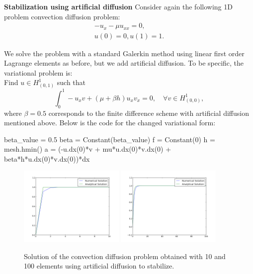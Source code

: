 \begin{example}{\textbf{Stabilization using artificial diffusion}} \label{cd:ex2} 
Consider again the following 1D problem convection diffusion problem: 
\begin{eqnarray}
-u_x - \mu u_{xx} = 0, \\ 
u(0) = 0, u(1) = 1 . 
\end{eqnarray}

We solve the problem with a standard Galerkin method using linear first
order Lagrange elements as before, but we add artificial diffusion. To be specific, the variational problem is:  \\   
Find $u \in H^1_{(0,1)}$ such that 
\[
\int_0^1 -u_x v + (\mu + \beta h) u_x v_x = 0, \quad \forall v \in H^1_{(0,0)},    
\]
where $\beta=0.5$ corresponds to the finite difference scheme with artificial diffusion mentioned
above.  Below is the code for the changed variational form:

\begin{python}
  beta_value = 0.5 
  beta = Constant(beta_value)
  f = Constant(0)
  h = mesh.hmin()
  a = (-u.dx(0)*v + mu*u.dx(0)*v.dx(0) + beta*h*u.dx(0)*v.dx(0))*dx  
\end{python}

\begin{figure}
\begin{center}
\includegraphics[width=0.45\textwidth]{chapters/conv-diff/plots/conv-diff-stab.png}
\includegraphics[width=0.45\textwidth]{chapters/conv-diff/plots/conv-diff-hr-stab.png}
\caption{Solution of the convection diffusion problem obtained with 10 and 100 elements
using artificial diffusion to stabilize.}
\label{fig:conv2}
\end{center}
\end{figure}


\end{example}
